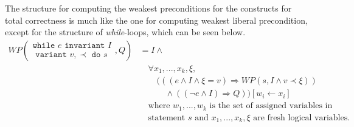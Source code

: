 The structure for computing the weakest preconditions for the constructs for total correctness is much like the one for computing weakest liberal precondition, except for the structure of \textit{while}-loops, which can be seen below.
\begin{equation}\label{eq:wpwhile}
\begin{align*}
	WP\left(
     \begin{array}{c}
     \texttt{while } e \texttt{ invariant } I \\
     \texttt{ variant } v, \prec \texttt{ do } s
     \end{array}
    , Q \right) 
    &= 
		I \land \label{eq:wpwhile} \\
    &\quad \forall x_1, ..., x_k, \xi, \\
    &\quad \quad (((e \land I \land \xi = v) \Rightarrow WP(s, I \land v \prec \xi)) \\
    &\quad \quad \quad \land ((\neg e \land I) \Rightarrow Q)) [w_i \leftarrow x_i] \\
	&\quad \text{where } w_1, ..., w_k \text{ is the set of assigned variables in} \\
  &\quad \text{statement } s \text{ and } x_1, ..., x_k, \xi \text{ are fresh logical variables.}
\end{align*}
\end{equation}








